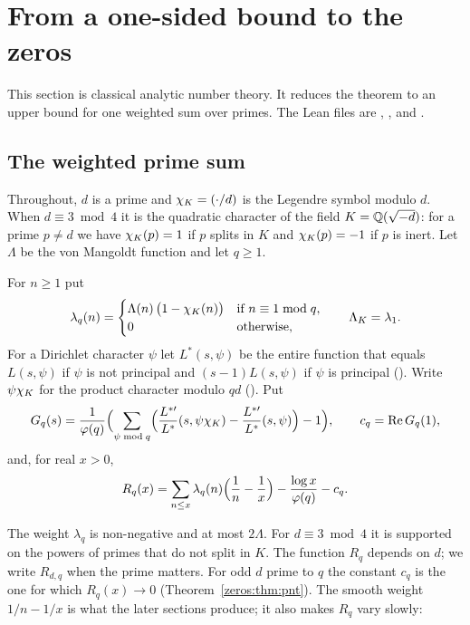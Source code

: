 \section{From a one-sided bound to the zeros}\label{sec:zeros}

This section is classical analytic number theory. It reduces the theorem to an upper bound for
one weighted sum over primes. The Lean files are ,
,  and
.

\subsection{The weighted prime sum}

Throughout, $d$ is a prime and $\chi_K = (\cdot/d)$ is the Legendre symbol modulo $d$. When
$d \equiv 3 \bmod 4$ it is the quadratic character of the field $K = \mathbb{Q}(\sqrt{-d})$: for a prime
$p \ne d$ we have $\chi_K(p) = 1$ if $p$ splits in $K$ and $\chi_K(p) = -1$ if $p$ is inert. Let
$\Lambda$ be the von Mangoldt function and let $q \ge 1$.

\begin{definition}\label{zeros:def:remainder}
For $n \ge 1$ put
\[
  \lambda_q(n) =
  \begin{cases}
    \Lambda(n)\,\bigl(1 - \chi_K(n)\bigr) & \text{if } n \equiv 1 \bmod q, \\
    0 & \text{otherwise,}
  \end{cases}
  \qquad \Lambda_K = \lambda_1 .
\]
For a Dirichlet character $\psi$ let $L^*(s,\psi)$ be the entire function that equals
$L(s,\psi)$ if $\psi$ is not principal and $(s-1)L(s,\psi)$ if $\psi$ is principal
(). Write $\psi\chi_K$ for the product character modulo $qd$
(). Put
\[
  G_q(s) = \frac{1}{\varphi(q)} \Bigl( \sum_{\psi \bmod q}
     \Bigl( \frac{L^{*\prime}}{L^*}(s,\psi\chi_K) - \frac{L^{*\prime}}{L^*}(s,\psi) \Bigr) - 1 \Bigr),
  \qquad c_q = \operatorname{Re} G_q(1),
\]
and, for real $x > 0$,
\begin{equation}\label{zeros:eq:R}
  R_q(x) = \sum_{n \le x} \lambda_q(n) \Bigl( \frac1n - \frac1x \Bigr)
           - \frac{\log x}{\varphi(q)} - c_q .
\end{equation}
\end{definition}

The weight $\lambda_q$ is non-negative and at most $2\Lambda$. For $d \equiv 3 \bmod 4$ it is
supported on the powers of primes that do not split in $K$. The function $R_q$ depends on $d$; we write $R_{d,q}$ when the
prime matters. For odd $d$ prime to $q$ the constant $c_q$ is the one for which $R_q(x) \to 0$
(Theorem~\ref{zeros:thm:pnt}). The smooth weight $1/n - 1/x$ is what the later sections produce;
it also makes $R_q$ vary slowly:

